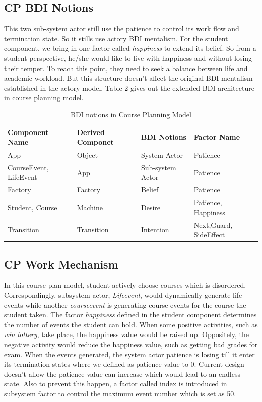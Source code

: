 \documentclass{sig-alternate}
\begin{document}
\subsection{CP BDI Notions}
This two sub-system actor still use the patience to control its work flow and termination state.  So it stills use actory BDI mentalism.  For the student component, we bring in one factor called {\em happiness} to extend its belief.  So from a student perspective, he/she would like to live with happiness and without losing their temper.  To reach this point, they need to seek a balance between life and academic workload.   But this structure doesn't affect the original BDI mentalism established in the actory model. Table 2 gives out the extended BDI architecture in course planning model.\\
\begin{table}
\centering
\caption{BDI notions in Course Planning Model}
\begin{tabular}{|l|l|l|l|}\hline
Component Name & Derived Componet & BDI Notions & Factor Name \\
\hline
App & Object & System Actor & Patience\\
\hline
CourseEvent, LifeEvent & App & Sub-system Actor & Patience\\
\hline
Factory & Factory  & Belief & Patience\\
\hline
Student, Course & Machine & Desire & Patience, Happiness \\
\hline
Transition& Transition & Intention & Next,Guard, SideEffect \\
\hline

\end{tabular}
\end{table}

\subsection{CP Work Mechanism}
In this course plan model, student actively choose courses which is disordered.  Correspondingly, subsystem actor, {\em Lifeevent}, would dynamically generate life events while another {\em courseevent} is generating course events for the course the student taken.  The factor {\em happiness} defined in the student component determines the number of events the student can hold.  When some positive activities, such as {\em win lottery}, take place, the happiness value would be raised up.  Oppositely, the negative activity would reduce the happiness value, such as getting bad grades for exam.  When the events generated, the system actor patience is losing till it enter its termination states where we defined as patience value to 0. Current design doesn't allow the patience value can increase which would lead to an endless state. Also to prevent this happen, a factor called index is introduced in subsystem factor to control the maximum event number which is set as 50.\\
\end{document}
